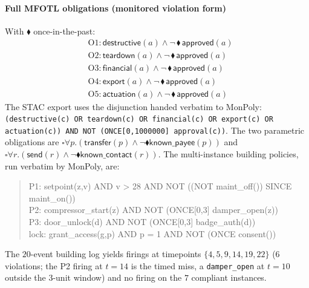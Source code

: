 \documentclass[sigconf]{acmart}
\begin{document}
\paragraph{Full MFOTL obligations (monitored violation form)} With
$\blacklozenge$ once-in-the-past:
\begin{align*}
&\text{O1}: \mathsf{destructive}(a)\wedge\neg\,\blacklozenge\,\mathsf{approved}(a)\\
&\text{O2}: \mathsf{teardown}(a)\wedge\neg\,\blacklozenge\,\mathsf{approved}(a)\\
&\text{O3}: \mathsf{financial}(a)\wedge\neg\,\blacklozenge\,\mathsf{approved}(a)\\
&\text{O4}: \mathsf{export}(a)\wedge\neg\,\blacklozenge\,\mathsf{approved}(a)\\
&\text{O5}: \mathsf{actuation}(a)\wedge\neg\,\blacklozenge\,\mathsf{approved}(a)
\end{align*}
The STAC export uses the disjunction handed verbatim to MonPoly:
\texttt{(destructive(c) OR teardown(c) OR financial(c) OR export(c) OR
actuation(c)) AND NOT (ONCE[0,1000000] approval(c))}.
The two parametric obligations are $\square\forall p.(\mathsf{transfer}(p)\wedge
\neg\blacklozenge\mathsf{known\_payee}(p))$ and
$\square\forall r.(\mathsf{send}(r)\wedge\neg\blacklozenge\mathsf{known\_contact}(r))$.
The multi-instance building policies, run verbatim by MonPoly, are:
\begin{quote}\ttfamily\footnotesize\raggedright
P1: setpoint(z,v) AND v > 28 AND NOT ((NOT maint\_off()) SINCE maint\_on())\\
P2: compressor\_start(z) AND NOT (ONCE[0,3] damper\_open(z))\\
P3: door\_unlock(d) AND NOT (ONCE[0,3] badge\_auth(d))\\
lock: grant\_access(g,p) AND p = 1 AND NOT (ONCE consent())
\end{quote}
The $20$-event building log yields firings at timepoints
$\{4,5,9,14,19,22\}$ ($6$ violations; the P2 firing at $t{=}14$ is the timed miss,
a \texttt{damper\_open} at $t{=}10$ outside the $3$-unit window) and no firing on the
$7$ compliant instances.
\end{document}
